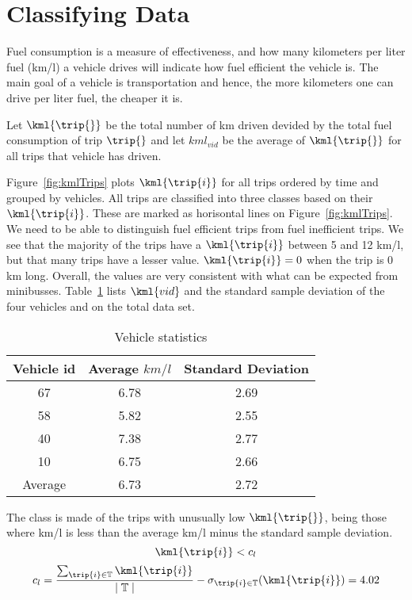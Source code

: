 \section{Classifying Data}

Fuel consumption is a measure of effectiveness, and how many kilometers per liter fuel (km/l) a vehicle drives will indicate how fuel efficient the vehicle is.
The main goal of a vehicle is transportation and hence, the more kilometers one can drive per liter fuel, the cheaper it is.




Let $\kml{\trip{}}$ be the total number of km driven devided by the total fuel consumption of trip $\trip{}$ and let $kml_{vid}$ be the average of $\kml{\trip{}}$ for all trips that vehicle \vid{\trip{}} has driven.

Figure~\ref{fig:kmlTrips} plots $\kml{\trip{i}}$ for all trips ordered by time and grouped by vehicles.
All trips are classified into three classes based on their $\kml{\trip{i}}$.
These are marked as horisontal lines on Figure~\ref{fig:kmlTrips}.
We need to be able to distinguish fuel efficient trips from fuel inefficient trips.  
We see that the majority of the trips have a $\kml{\trip{i}}$ between 5 and 12 km/l, but that many trips have a lesser value.
$\kml{\trip{i}}=0$ when the trip is 0 km long.
Overall, the values are very consistent with what can be expected from minibusses.
Table~\ref{tb:tripStatistics} lists $\kml{\vid{}}$ and the standard sample deviation of the four vehicles and on the total data set.

\begin{table}
\begin{center}
\begin{tabular}{|c|c|c|}\hline %
Vehicle id & Average $km/l$ & Standard Deviation \\\hline
67 & 6.78 & 2.69\\\hline
58 & 5.82 & 2.55\\\hline
40 & 7.38 & 2.77\\\hline
10 & 6.75 & 2.66\\\hline\hline
Average & 6.73 & 2.72\\\hline
\end{tabular}
\end{center}
\caption{Vehicle statistics}\label{tb:tripStatistics}
\end{table}

The class \fuelLow is made of the trips with unusually low $\kml{\trip{}}$, being those where km/l is less than the average km/l minus the standard sample deviation.
\[\kml{\trip{i}} < c_l\]
\[c_l = \frac{\sum_{\trip{i}\in \mathbb{T}}\kml{\trip{i}}}{\mid \mathbb{T}\mid} - \sigma_{\trip{i}\in \mathbb{T}}(\kml{\trip{i}}) = 4.02\]%

